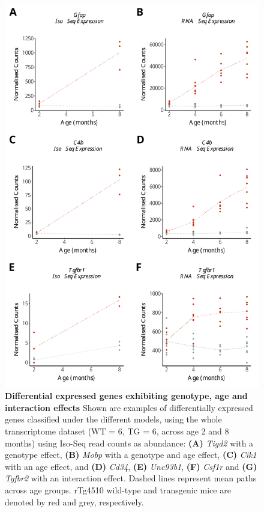   
\begin{figure}[h]
	\centering
	\includegraphics[page=5,scale = 0.55]{Figures/WholeDifferentialAnalysis.pdf}
	\captionsetup{width=0.95\textwidth}
	\caption[Examples of gene expression differing across conditions]%
	{\textbf{Differential expressed genes exhibiting genotype, age and interaction effects} Shown are examples of differentially expressed genes classified under the different models, using the whole transcriptome dataset (WT = 6, TG = 6, across age 2 and 8 months) using Iso-Seq read counts as abundance: \textbf{(A)} \textit{Tigd2} with a genotype effect, \textbf{(B)} \textit{Mobp} with a genotype and age effect, \textbf{(C)} \textit{Cik1} with an age effect, and \textbf{(D)} \textit{Cd34}, \textbf{(E)} \textit{Unc93b1}, \textbf{(F)} \textit{Csf1r} and \textbf{(G)} \textit{Tgfbr2} with an interaction effect. Dashed lines represent mean paths across age groups. rTg4510 wild-type and transgenic mice are denoted by red and grey, respectively. }   
	\label{fig:dea_model_genexp}
\end{figure}
 
